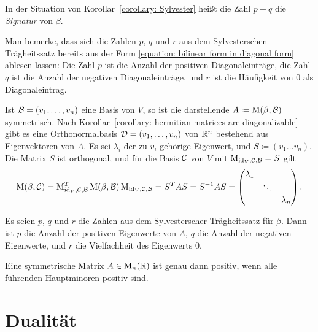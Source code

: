 \begin{definition}
  In der Situation von Korollar~\ref{corollary: Sylvester} heißt die Zahl $p - q$ die \emph{Signatur} von $\beta$.
\end{definition}

Man bemerke, dass sich die Zahlen $p$, $q$ und $r$ aus dem Sylvesterschen Trägheitssatz bereits aus der Form \eqref{equation: bilinear form in diagonal form} ablesen lassen:
Die Zahl $p$ ist die Anzahl der positiven Diagonaleinträge, die Zahl $q$ ist die Anzahl der negativen Diagonaleinträge, und $r$ ist die Häufigkeit von $0$ als Diagonaleintrag.

Ist $\mathcal{B} = (v_1, \dotsc, v_n)$ eine Basis von $V$, so ist die darstellende $A \coloneqq \operatorname{M}(\beta, \mathcal{B})$ symmetrisch.
Nach Korollar~\ref{corollary: hermitian matrices are diagonalizable} gibt es eine Orthonormalbasis $\mathcal{D} = (v_1, \dotsc, v_n)$ von $\mathbb{R}^n$ bestehend aus Eigenvektoren von $A$.
Es sei $\lambda_i$ der zu $v_i$ gehörige Eigenwert, und $S \coloneqq (v_1 \dotsc v_n)$.
Die Matrix $S$ ist orthogonal, und für die Basis $\mathcal{C}$ von $V$ mit $\operatorname{M}_{\operatorname{id}_V, \mathcal{C}, \mathcal{B}} = S$ gilt
\[
    \operatorname{M}(\beta, \mathcal{C})
  = \operatorname{M}_{\operatorname{id}_V, \mathcal{C}, \mathcal{B}} ^T
    \operatorname{M}(\beta, \mathcal{B})
    \operatorname{M}_{\operatorname{id}_V, \mathcal{C}, \mathcal{B}}
  = S^T A S
  = S^{-1} A S
  = \begin{pmatrix}
      \lambda_1 &         &           \\
                & \ddots  &           \\
                &         & \lambda_n
    \end{pmatrix}.
\]

\begin{proposition}
  Es seien $p$, $q$ und $r$ die Zahlen aus dem Sylvesterscher Trägheitssatz für $\beta$.
  Dann ist $p$ die Anzahl der positiven Eigenwerte von $A$, $q$ die Anzahl der negativen Eigenwerte, und $r$ die Vielfachheit des Eigenwerts $0$.
\end{proposition}

\begin{lemma}[Hauptminorenkriterium]
  Eine symmetrische Matrix $A \in \operatorname{M}_{n}(\mathbb{R})$ ist genau dann positiv, wenn alle führenden Hauptminoren positiv sind.
\end{lemma}





\section{Dualität}

